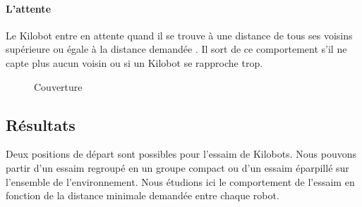 \documentclass[a4paper]{article}
\begin{document}
\paragraph{L'attente} Le Kilobot entre en attente quand il se trouve à une distance de tous ses voisins supérieure ou égale à la distance demandée . Il sort de ce comportement s'il ne capte plus aucun voisin ou si un Kilobot se rapproche trop.\\


\begin{figure}[h!]
\centering
{}
\caption{Couverture}
\end{figure}
\newpage
\subsection{Résultats}
Deux positions de départ sont possibles pour l'essaim de Kilobots. Nous pouvons partir d'un essaim regroupé en un groupe compact ou d'un essaim éparpillé sur l'ensemble de l'environnement.
Nous étudions ici le comportement de l'essaim en fonction de la distance minimale demandée entre chaque robot.
\end{document}
